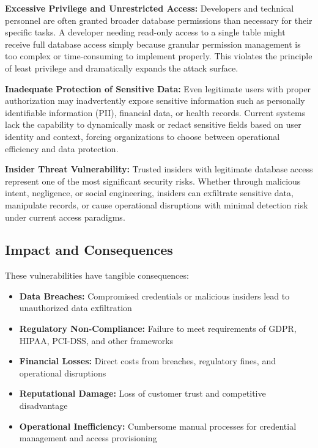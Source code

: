 \textbf{Excessive Privilege and Unrestricted Access:} Developers and technical personnel are often granted broader database permissions than necessary for their specific tasks. A developer needing read-only access to a single table might receive full database access simply because granular permission management is too complex or time-consuming to implement properly. This violates the principle of least privilege and dramatically expands the attack surface.

\textbf{Inadequate Protection of Sensitive Data:} Even legitimate users with proper authorization may inadvertently expose sensitive information such as personally identifiable information (PII), financial data, or health records. Current systems lack the capability to dynamically mask or redact sensitive fields based on user identity and context, forcing organizations to choose between operational efficiency and data protection.

\textbf{Insider Threat Vulnerability:} Trusted insiders with legitimate database access represent one of the most significant security risks. Whether through malicious intent, negligence, or social engineering, insiders can exfiltrate sensitive data, manipulate records, or cause operational disruptions with minimal detection risk under current access paradigms.

\subsection{Impact and Consequences}
These vulnerabilities have tangible consequences:
\begin{itemize}
    \item \textbf{Data Breaches:} Compromised credentials or malicious insiders lead to unauthorized data exfiltration
    \item \textbf{Regulatory Non-Compliance:} Failure to meet requirements of GDPR, HIPAA, PCI-DSS, and other frameworks
    \item \textbf{Financial Losses:} Direct costs from breaches, regulatory fines, and operational disruptions
    \item \textbf{Reputational Damage:} Loss of customer trust and competitive disadvantage
    \item \textbf{Operational Inefficiency:} Cumbersome manual processes for credential management and access provisioning
\end{itemize}

